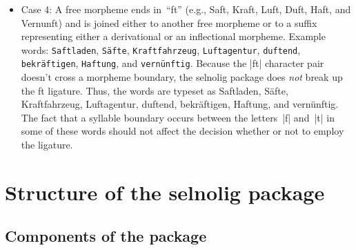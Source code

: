 \documentclass[11pt]{article}
\newcommand{\pkg}[1]{\textsf{#1}}
\newcommand{\opt}[1]{\texttt{#1}}
\begin{document}
\begin{itemize}
\begin{itemize}
\begin{itemize}
\item It would also seem OK to use the ft-ligature in expressions such as \enquote{zu fünft} and \enquote{die zwölftschnells\kern0pt te Sprinterin Bayerns}: even though the |t| character now represents a derivational morpheme, the ligature occurs at end of the word or word fragment. In the case of the word \enquote{zwölftschnells\breaklig te}, the argument for keeping the ft ligature is based on the observation that the entire fragment \enquote{zwölft} serves a prefix to \enquote{schnells\kern0pt te}. 

In contrast, the ft-ligature should \emph{not} be used in \enquote{Beethoven's Fünfte Synphonie} and \enquote{zum elften Mal}. Observe that the argument in favor of breaking up the ft-ligature in the words \enquote{Fünfte} and \enquote{elften} is \emph{not} related to the fact that the words happen to have two syllables and that the syllables are divided between the letters~|f| and~|t|.

\end{itemize}

\item Case 4: A free morpheme ends in~\enquote{ft} (e.g., Saft, Kraft, Luft, Duft, Haft, and Vernunft) and is joined either to another free morpheme or to a suffix representing either a derivational or an inflectional morpheme. Example words: \opt{Saftladen}, \opt{Säfte}, \opt{Kraftfahrzeug}, \opt{Luftagentur}, \opt{duftend}, \opt{bekräftigen}, \opt{Haftung}, and \opt{ver\-nünftig}. Because the |ft| character pair doesn't cross a morpheme boundary, the \pkg{selnolig} package does \emph{not} break up the ft ligature. Thus, the words are typeset as Saftladen, Säfte, Kraftfahrzeug, Luftagentur, duftend, bekräftigen, Haftung, and ver\-nünftig. The fact that a syllable boundary occurs between the letters~|f| and~|t| in some of these words should not affect the decision whether or not to employ the ligature.

\end{itemize}
\end{itemize}


\section[Structure of the selnolig package]{Structure of the \pkg{selnolig} package}

\subsection{Components of the package}
\end{document}
